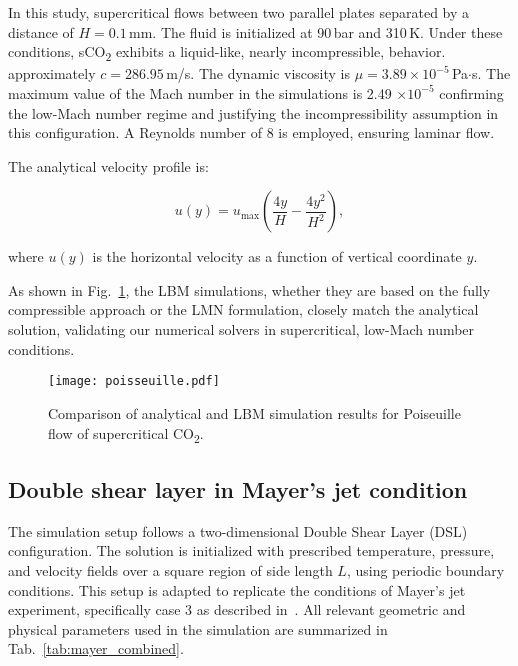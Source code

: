 In this study, supercritical  flows between two parallel plates
separated by a distance of \(H = 0.1\,\text{mm}\). The fluid is initialized at
90\,bar and 310\,K. Under these conditions, sCO\textsubscript{2} exhibits a
liquid-like, nearly incompressible, behavior. %
approximately $c = 286.95$\,m/s. The dynamic viscosity is $\mu = 3.89 \times
10^{-5}$\,Pa$\cdot$s. 
The maximum value of the Mach number in the simulations is 2.49 $\times 10^{-5}$
confirming the low-Mach number regime and justifying the incompressibility
assumption in this configuration. A Reynolds number of 8 is employed, ensuring
laminar flow. 

The analytical velocity profile is:

\begin{equation}
u(y) = u_{\text{max}} \left( \frac{4y}{H} - \frac{4y^2}{H^2} \right),
\end{equation}

where $u(y)$ is the horizontal velocity as a function of vertical coordinate
$y$.

As shown in Fig.~\ref{fig:poiseuille}, the LBM simulations, whether they are
based on the fully compressible approach or the LMN formulation, closely match
the analytical solution, validating our numerical solvers in supercritical,
low-Mach number conditions.


\begin{figure}[htb]
\centering
\texttt{[image: poisseuille.pdf]}
\caption{Comparison of analytical and LBM simulation results for Poiseuille flow
of supercritical CO\textsubscript{2}.}
\label{fig:poiseuille}
\end{figure}

\subsection{Double shear layer in Mayer's jet condition}
The simulation setup follows a two-dimensional Double Shear Layer (DSL)
configuration. The solution is initialized with prescribed temperature,
pressure, and velocity fields over a square region of side length \(L\), using
periodic boundary conditions. This setup is adapted to replicate the conditions
of Mayer’s jet experiment, specifically case 3 as described
in~\cite{mayer2003raman, petit2013large}. All relevant geometric and physical
parameters used in the simulation are summarized in
Tab.~\ref{tab:mayer_combined}.

